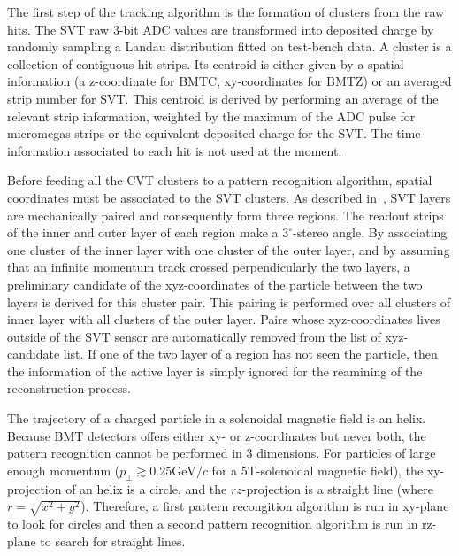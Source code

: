 \documentclass{elsart}
\begin{document}
The first step of the tracking algorithm is the formation of clusters from the raw hits. The SVT raw 3-bit ADC values 
are transformed into deposited charge by randomly sampling a Landau distribution fitted on test-bench data. A cluster 
is a collection of contiguous hit strips. Its centroid is either given by a spatial information (a z-coordinate for 
BMTC, xy-coordinates for BMTZ) or an averaged strip number for SVT. This centroid is derived by performing an average of 
the relevant strip information, weighted by the maximum of the ADC pulse for micromegas strips or the equivalent 
deposited charge for the SVT.
The time information associated to each hit is not used at the moment.

Before feeding all the CVT clusters to a pattern recognition algorithm, spatial coordinates must be associated to the 
SVT clusters. As described in~\cite{svt-nim}, SVT layers are mechanically paired and consequently form three regions. 
The readout strips of the inner and outer layer of each region make a $3^\circ$-stereo angle. By associating one 
cluster of the inner layer with one cluster of the outer layer, and by assuming that an infinite momentum track crossed 
perpendicularly the two layers, a preliminary candidate of the xyz-coordinates of the particle between the two layers 
is derived for this cluster pair. This pairing is performed over all clusters of inner layer with all clusters of the 
outer layer. Pairs whose xyz-coordinates lives outside of the SVT sensor are automatically removed from the list of 
xyz-candidate list. If one of the two layer of a region has not seen the particle, then the information of the active 
layer is simply ignored for the reamining of the reconstruction process.

The trajectory of a charged particle in a solenoidal magnetic field is an helix. Because BMT detectors offers either 
xy- or z-coordinates but never both, the pattern recognition cannot be performed in 3 dimensions. For particles of 
large enough momentum ($p_\perp \gtrsim 0.25 \text{GeV}/c$ for a 5T-solenoidal magnetic field), the xy-projection of an 
helix is a circle, and the $rz$-projection is a straight line (where $r = \sqrt{x^2 + y^2}$). Therefore, a first 
pattern recongition algorithm is run in xy-plane to look for circles and then a second pattern recognition algorithm is 
run in rz-plane to search for straight lines.   
\end{document}
